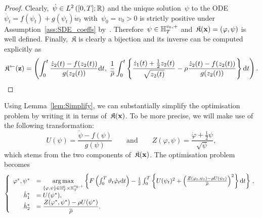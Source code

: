 \begin{proof}
Clearly,~$\dot{\psi}\in L^{2}\left([0, T]; \mathbb{R}\right)$ and the unique solution~$\psi$ to the ODE~${\dot{\psi_t}=f(\psi_t)+g(\psi_t)\dot{w}_t}$ with~$\psi_0 = v_0 > 0$ is strictly positive under Assumption~\ref{ass:SDE_coeffs} by~\cite[Proposition 3.11]{Baldi2011GeneralDiffusions}. Therefore~$\psi\in\mathbb{H}_T^{v_0, +}$ and~$\mathfrak{K}(\boldsymbol{\mathrm{x}})=(\varphi, \psi)$ is well defined.
Finally,~$\mathfrak{K}$ is clearly a bijection and its inverse can be computed explicitly as
\[
\mathfrak{K}^{\leftarrow}(\boldsymbol{\mathrm{z}}) = \left(\int_0^t \frac{\dot{z}_2(t)-f(z_2(t))}{g(z_2(t))}\mathrm{d} t,\; \frac1{\overline{\rho}}\int_0^t\left\{ \frac{\dot{z}_1(t) + \frac{1}{2}z_2(t)}{\sqrt{z_2(t)}} - \rho\frac{\dot{z}_2(t)-f(z_2(t))}{g(z_2(t))} \right\} \mathrm{d} t\right).
\]
\end{proof}
Using Lemma~\ref{lem:Simplify}, we can substantially simplify the optimisation problem by writing it in terms of~$\mathfrak{K}(\boldsymbol{\mathrm{x}})$. To be more precise, we will make use of the following transformation:
\begin{equation}\label{eq:transformation_UZ}
U(\psi) = \frac{\dot{\psi} - f(\psi)}{g(\psi)}
\qquad\text{and}\qquad
Z(\varphi,\psi) = \frac{\dot{\varphi} + \frac{1}{2}\psi}{\sqrt{\psi}},
\end{equation}
which stems from the two components of~$\mathfrak{K}(\boldsymbol{\mathrm{x}})$. The optimisation problem becomes
\begin{equation*}
\left\{
\begin{array}{rl}
\varphi^{*},\psi^{*} &= \operatorname*{arg\,max}\limits_{\{\varphi,\psi\} \in \mathbb{H}_T^0\times \mathbb{H}_T^{v_0,+}} \left\{F\left(\int_0^T\vartheta_t \dot{\varphi}_t \mathrm{d} t\right) - \frac{1}{2}\int_0^T \left\{U(\psi_t)^2 + \left(\frac{Z(\varphi_t,\psi_t) - \rho U(\psi_t)}{\overline{\rho}}\right)^2\right\}\mathrm{d} t\right\}\,,\\
\dot{h}_1^{*} &= U(\psi^{*}), \\
\dot{h}_2^{*} &= \displaystyle \frac{Z(\varphi^{*},\psi^{*}) - \rho U(\psi^{*})}{\overline{\rho}}.
\end{array}
\right.
\end{equation*}
